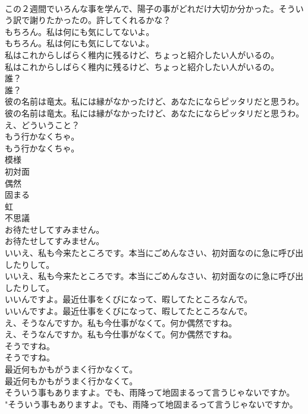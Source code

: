 \documentclass[8pt]{extreport}
\begin{document}
\begin{CJK}{UTF8}{min}
\\	この２週間でいろんな事を学んで、陽子の事がどれだけ大切か分かった。そういう訳で謝りたかったの。許してくれるかな？ 
\\	もちろん。私は何にも気にしてないよ。	
\\	もちろん。私は何にも気にしてないよ。 
\\	私はこれからしばらく稚内に残るけど、ちょっと紹介したい人がいるの。	
\\	私はこれからしばらく稚内に残るけど、ちょっと紹介したい人がいるの。 
\\	誰？	
\\	誰？ 
\\	彼の名前は竜太。私には縁がなかったけど、あなたにならピッタリだと思うわ。	
\\	彼の名前は竜太。私には縁がなかったけど、あなたにならピッタリだと思うわ。 
\\	え、どういうこと？ 
\\	もう行かなくちゃ。	
\\	もう行かなくちゃ。 
\\	模様
\\	初対面
\\	偶然
\\	固まる
\\	虹
\\	不思議
\\	お待たせしてすみません。	
\\	お待たせしてすみません。 
\\	いいえ、私も今来たところです。本当にごめんなさい、初対面なのに急に呼び出したりして。	
\\	いいえ、私も今来たところです。本当にごめんなさい、初対面なのに急に呼び出したりして。 
\\	いいんですよ。最近仕事をくびになって、暇してたところなんで。	
\\	いいんですよ。最近仕事をくびになって、暇してたところなんで。 
\\	え、そうなんですか。私も今仕事がなくて。何か偶然ですね。	
\\	え、そうなんですか。私も今仕事がなくて。何か偶然ですね。 
\\	そうですね。	
\\	そうですね。 
\\	最近何もかもがうまく行かなくて。	
\\	最近何もかもがうまく行かなくて。 
\\	そういう事もありますよ。でも、雨降って地固まるって言うじゃないですか。	
\\	"そういう事もありますよ。でも、雨降って地固まるって言うじゃないですか。 

\end{CJK}
\end{document}
